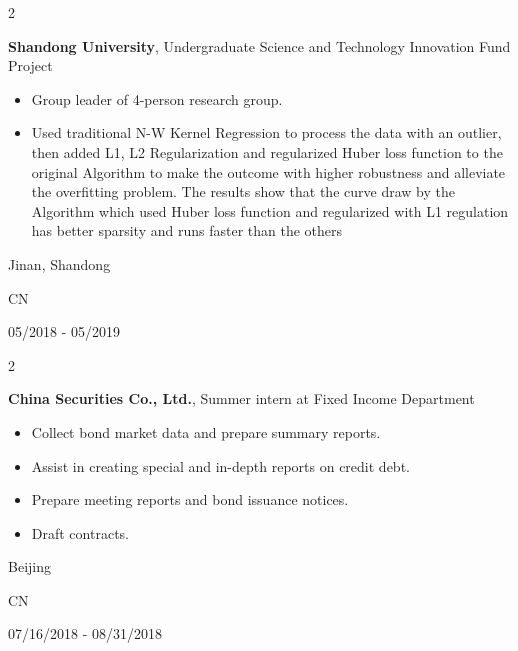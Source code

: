 \documentclass[10pt, letterpaper]{article}
\newenvironment{highlights}{
    \begin{itemize}[
        topsep=0.10 cm,
        parsep=0.10 cm,
        partopsep=0pt,
        itemsep=0pt,
        leftmargin=0.4 cm + 10pt
    ]
}{
    \end{itemize}
} %
\newenvironment{twocolentry}[2][]{
    \onecolentry
    \def\secondColumn{#2}
    \setcolumnwidth{\fill, 4.5 cm}
    \begin{paracol}{2}
}{
    \switchcolumn \raggedleft \secondColumn
    \end{paracol}
    \endonecolentry
} %
\begin{document}
        \begin{twocolentry}{
            Jinan, Shandong

            CN

            05/2018 - 05/2019
        }
            \textbf{Shandong University}, Undergraduate Science and Technology Innovation Fund Project
            \begin{highlights}
                \item Group leader of 4-person research group.
                \item Used traditional N-W Kernel Regression to process the data with an outlier, then added L1, 
                L2 Regularization and regularized Huber loss function to the original Algorithm to make the outcome
                with higher robustness and alleviate the overfitting problem. The results show that the curve draw by
                the Algorithm which used Huber loss function and regularized with L1 regulation has better sparsity
                and runs faster than the others
            \end{highlights}
        \end{twocolentry}


        \begin{twocolentry}{
            Beijing

            CN

            07/16/2018 - 08/31/2018
        }
            \textbf{China Securities Co., Ltd.}, Summer intern at Fixed Income Department
            \begin{highlights}
                \item Collect bond market data and prepare summary reports.
                \item Assist in creating special and in-depth reports on credit debt.
                \item Prepare meeting reports and bond issuance notices.
                \item Draft contracts.
            \end{highlights}
        \end{twocolentry}



    



        
\end{document}
